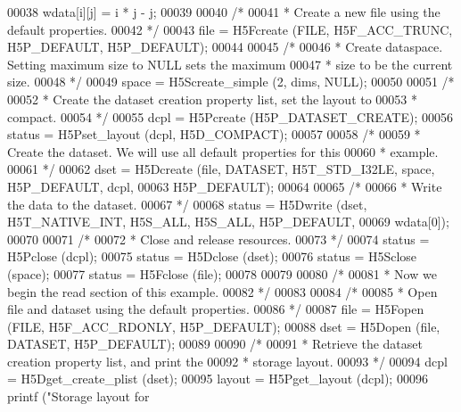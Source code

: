 \begin{DoxyCode}
00038             wdata[i][j] = i * j - j;
00039 
00040     \textcolor{comment}{/*}
00041 \textcolor{comment}{     * Create a new file using the default properties.}
00042 \textcolor{comment}{     */}
00043     file = H5Fcreate (FILE, H5F\_ACC\_TRUNC, H5P\_DEFAULT, H5P\_DEFAULT);
00044 
00045     \textcolor{comment}{/*}
00046 \textcolor{comment}{     * Create dataspace.  Setting maximum size to NULL sets the maximum}
00047 \textcolor{comment}{     * size to be the current size.}
00048 \textcolor{comment}{     */}
00049     space = H5Screate\_simple (2, dims, NULL);
00050 
00051     \textcolor{comment}{/*}
00052 \textcolor{comment}{     * Create the dataset creation property list, set the layout to}
00053 \textcolor{comment}{     * compact.}
00054 \textcolor{comment}{     */}
00055     dcpl = H5Pcreate (H5P\_DATASET\_CREATE);
00056     status = H5Pset\_layout (dcpl, H5D\_COMPACT);
00057 
00058     \textcolor{comment}{/*}
00059 \textcolor{comment}{     * Create the dataset.  We will use all default properties for this}
00060 \textcolor{comment}{     * example.}
00061 \textcolor{comment}{     */}
00062     dset = H5Dcreate (file, DATASET, H5T\_STD\_I32LE, space, H5P\_DEFAULT, dcpl,
00063                 H5P\_DEFAULT);
00064 
00065     \textcolor{comment}{/*}
00066 \textcolor{comment}{     * Write the data to the dataset.}
00067 \textcolor{comment}{     */}
00068     status = H5Dwrite (dset, H5T\_NATIVE\_INT, H5S\_ALL, H5S\_ALL, H5P\_DEFAULT,
00069                 wdata[0]);
00070 
00071     \textcolor{comment}{/*}
00072 \textcolor{comment}{     * Close and release resources.}
00073 \textcolor{comment}{     */}
00074     status = H5Pclose (dcpl);
00075     status = H5Dclose (dset);
00076     status = H5Sclose (space);
00077     status = H5Fclose (file);
00078 
00079 
00080     \textcolor{comment}{/*}
00081 \textcolor{comment}{     * Now we begin the read section of this example.}
00082 \textcolor{comment}{     */}
00083 
00084     \textcolor{comment}{/*}
00085 \textcolor{comment}{     * Open file and dataset using the default properties.}
00086 \textcolor{comment}{     */}
00087     file = H5Fopen (FILE, H5F\_ACC\_RDONLY, H5P\_DEFAULT);
00088     dset = H5Dopen (file, DATASET, H5P\_DEFAULT);
00089 
00090     \textcolor{comment}{/*}
00091 \textcolor{comment}{     * Retrieve the dataset creation property list, and print the}
00092 \textcolor{comment}{     * storage layout.}
00093 \textcolor{comment}{     */}
00094     dcpl = H5Dget\_create\_plist (dset);
00095     layout = H5Pget\_layout (dcpl);
00096     printf (\textcolor{stringliteral}{"Storage layout for %
}
\end{DoxyCode}
